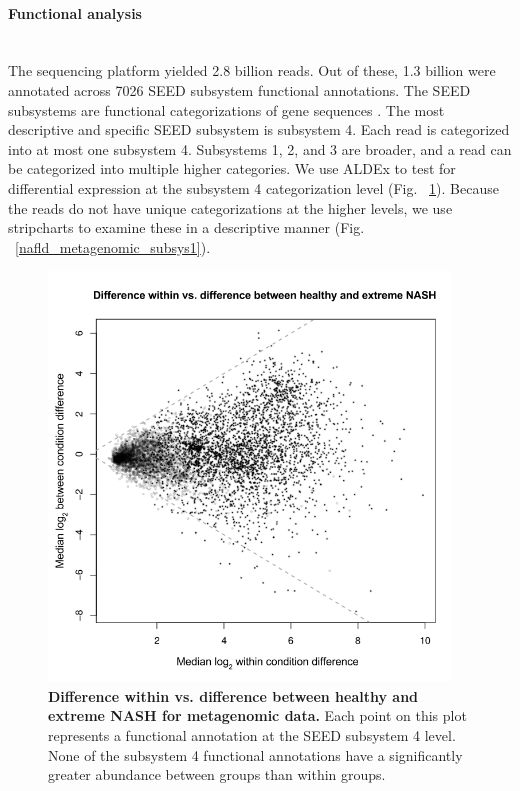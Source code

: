 \paragraph{Functional analysis}\mbox{}\\
The sequencing platform yielded 2.8 billion reads. Out of these, 1.3 billion were annotated across 7026 SEED subsystem functional annotations. The SEED subsystems are functional categorizations of gene sequences \cite{overbeek2005subsystems}. The most descriptive and specific SEED subsystem is subsystem 4. Each read is categorized into at most one subsystem 4. Subsystems 1, 2, and 3 are broader, and a read can be categorized into multiple higher categories. We use ALDEx to test for differential expression at the subsystem 4 categorization level (Fig. ~\ref{nafld_metagenomic_aldex}). Because the reads do not have unique categorizations at the higher levels, we use stripcharts to examine these in a descriptive manner (Fig. ~\ref{nafld_metagenomic_subsys1}).

\begin{figure}[h]
\begin{center}
\includegraphics[width=0.95\textwidth]{metagenomic_aldex.png}
\caption[Difference within vs. difference between healthy and extreme NASH for metagenomic data.]{\textbf{Difference within vs. difference between healthy and extreme NASH for metagenomic data.} Each point on this plot represents a functional annotation at the SEED subsystem 4 level. None of the subsystem 4 functional annotations have a significantly greater abundance between groups than within groups.}
\label{nafld_metagenomic_aldex}
\end{center}
\end{figure}

